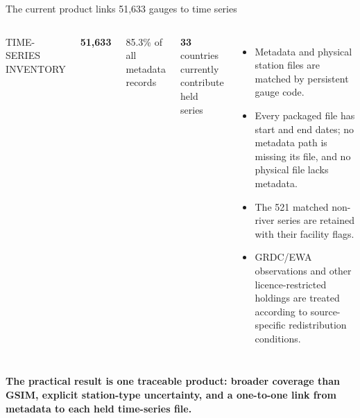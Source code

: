 \documentclass[t,aspectratio=169,10pt]{beamer}
\begin{document}
\begin{frame}{The current product links 51,633 gauges to time series}
  \vspace*{0.02cm}
  \begin{columns}[T,onlytextwidth]
      \vspace{0pt}
      {\sffamily\scriptsize\color{GSGDMuted}TIME-SERIES INVENTORY}\par
      {\bfseries\Huge\color{GSGDRed}51,633}\par
      \vspace{0.16cm}
      {\large 85.3\% of all metadata records}\par
      \vspace{0.40cm}
      {\bfseries\Large 33} countries currently contribute held series
      \vspace{0pt}
      \small
      \begin{itemize}
        \item Metadata and physical station files are matched by persistent gauge code.
        \item Every packaged file has start and end dates; no metadata path is missing
          its file, and no physical file lacks metadata.
        \item The 521 matched non-river series are retained with their facility flags.
        \item GRDC/EWA observations and other licence-restricted holdings are treated
          according to source-specific redistribution conditions.
      \end{itemize}
  \end{columns}

  \vspace{0.24cm}
  \centering
  \begin{minipage}{0.88\textwidth}
    \small\bfseries
    The practical result is one traceable product: broader coverage than GSIM,
    explicit station-type uncertainty, and a one-to-one link from metadata to each
    held time-series file.
  \end{minipage}
\end{frame}
\end{document}
